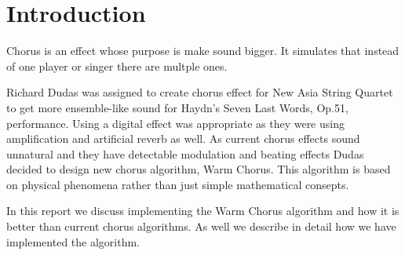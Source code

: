 \section{Introduction}

Chorus is an effect whose purpose is make sound bigger. It simulates that
instead of one player or singer there are multple ones. 

Richard Dudas was assigned to create chorus effect for New Asia String Quartet to get more
ensemble-like sound for Haydn's Seven Last Words, Op.51, performance. Using a digital effect
was appropriate as they were using amplification and artificial reverb as well. 
As current chorus effects sound unnatural and they have detectable modulation
and beating effects Dudas decided to design new chorus algorithm, Warm Chorus. 
This algorithm is based on physical phenomena rather than just simple mathematical 
consepts. \cite{dudas}

In this report we discuss implementing the Warm Chorus algorithm and how it is
better than current chorus algorithms. As well we describe in detail how we have 
implemented the algorithm.
